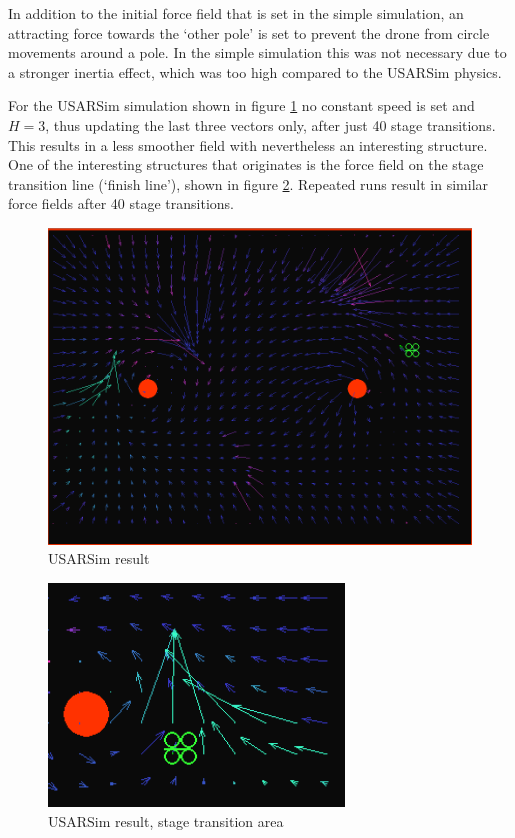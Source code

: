 \documentclass[11pt]{article}
\begin{document}
In addition to the initial force field that is set in the simple simulation, an attracting force towards the `other pole' is set to prevent the drone from circle movements around a pole. In the simple simulation this was not necessary due to a stronger inertia effect, which was too high compared to the USARSim physics.

For the USARSim simulation shown in figure \ref{fig:usarsim_result1} no constant speed is set and $H = 3$, thus updating the last three vectors only, after just 40 stage transitions. This results in a less smoother field with nevertheless an interesting structure. One of the interesting structures that originates is the force field on the stage transition line (`finish line'), shown in figure \ref{fig:usarsim_transition}. Repeated runs result in similar force fields after 40 stage transitions.

  \begin{figure}
    \includegraphics[width=1.0\textwidth]{img/usarsim_result1}
    \caption{USARSim result}
    \label{fig:usarsim_result1}
  \end{figure}

  \begin{figure}
    \begin{center}
    \includegraphics[width=0.7\textwidth]{img/usarsim_transition}
    \caption{USARSim result, stage transition area}
    \label{fig:usarsim_transition}
    \end{center}
  \end{figure}
\end{document}
